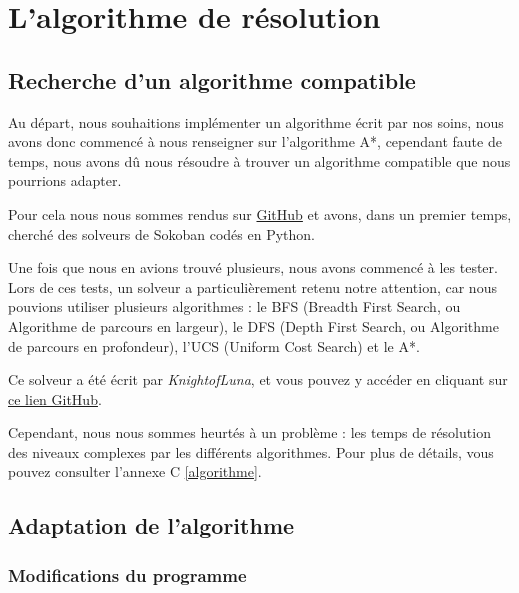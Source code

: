 \documentclass[a4paper,12pt]{article} %
\begin{document}
\section{L'algorithme de résolution}

\subsection{Recherche d'un algorithme compatible}

Au départ, nous souhaitions implémenter un algorithme écrit par nos soins, nous avons donc commencé à nous renseigner sur l'algorithme A*, cependant faute de temps, nous avons dû nous résoudre à trouver un algorithme compatible que nous pourrions adapter.

Pour cela nous nous sommes rendus sur \href{https://github.com/}{GitHub} et avons, dans un premier temps, cherché des solveurs de Sokoban codés en Python.

Une fois que nous en avions trouvé plusieurs, nous avons commencé à les tester. Lors de ces tests, un solveur a particulièrement retenu notre attention, car nous pouvions utiliser plusieurs algorithmes : le BFS (Breadth First Search, ou Algorithme de parcours en largeur), le DFS (Depth First Search, ou Algorithme de parcours en profondeur), l'UCS (Uniform Cost Search) et le A*. 

Ce solveur a été écrit par \textit{KnightofLuna}, et vous pouvez y accéder en cliquant sur  \href{https://github.com/KnightofLuna/sokoban-solver}{ce lien GitHub}.

Cependant, nous nous sommes heurtés à un problème : les temps de résolution des niveaux complexes par les différents algorithmes. Pour plus de détails, vous pouvez consulter l'annexe C \ref{algorithme}.

\subsection{Adaptation de l'algorithme}

\subsubsection{Modifications du programme}
\end{document}

